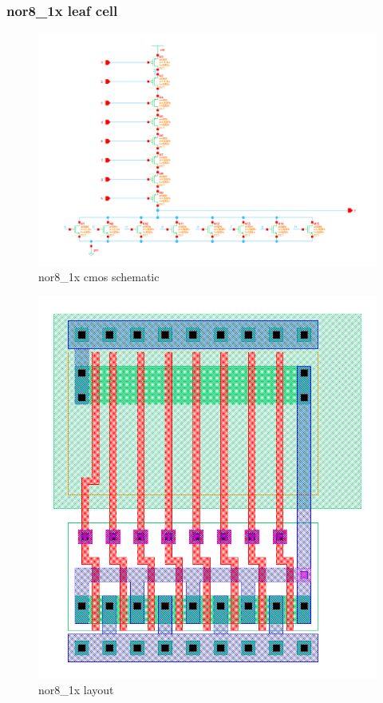 \documentclass[]{article}
\begin{document}
\subsubsection{nor8\_1x leaf cell}
\begin{figure}[H]
\centering
\includegraphics[width=.9\textwidth]{nor8_1x-cmos_sch}
\caption{nor8\_1x cmos schematic}
\label{fig:nor8-schematic}
\end{figure}

\begin{figure}[H]
\centering
\includegraphics[width=.9\textwidth]{nor8_1x-layout}
\caption{nor8\_1x layout}
\label{fig:nor8-layout}
\end{figure}
\end{document}

